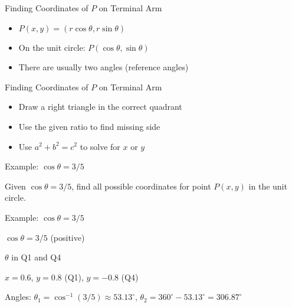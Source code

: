 \documentclass[aspectratio=169]{beamer}
\begin{document}
\begin{frame}{Finding Coordinates of $P$ on Terminal Arm}
    \begin{tcolorbox}[colback=lightgray,colframe=primary,title=Method 1: Using Central Angle]
        \footnotesize
        \begin{itemize}
            \item $P(x, y) = (r\cos\theta, r\sin\theta)$
            \item On the unit circle: $P(\cos\theta, \sin\theta)$
            \item There are usually two angles (reference angles)
        \end{itemize}
    \end{tcolorbox}
\end{frame}

\begin{frame}{Finding Coordinates of $P$ on Terminal Arm}
    \begin{tcolorbox}[colback=lightgray,colframe=accent,title=Method 2: Using Pythagorean Theorem]
        \footnotesize
        \begin{itemize}
            \item Draw a right triangle in the correct quadrant
            \item Use the given ratio to find missing side
            \item Use $a^2 + b^2 = c^2$ to solve for $x$ or $y$
        \end{itemize}
    \end{tcolorbox}
\end{frame}

\begin{frame}{Example: $\cos\theta = 3/5$}
    \begin{tcolorbox}[colback=lightgray,colframe=primary,title=Question]
        \footnotesize
        Given $\cos\theta = 3/5$, find all possible coordinates for point $P(x,y)$ in the unit circle.
    \end{tcolorbox}
\end{frame}

\begin{frame}{Example: $\cos\theta = 3/5$}
    \begin{tcolorbox}[colback=lightgray,colframe=primary,title=Solution]
        \footnotesize
        $\cos\theta = 3/5$ (positive)\par
        $\theta$ in Q1 and Q4\par
        $x = 0.6$, $y = 0.8$ (Q1), $y = -0.8$ (Q4)\par
        Angles: $\theta_1 = \cos^{-1}(3/5) \approx 53.13^\circ$, $\theta_2 = 360^\circ - 53.13^\circ = 306.87^\circ$
    \end{tcolorbox}
\end{frame}
\end{document}
